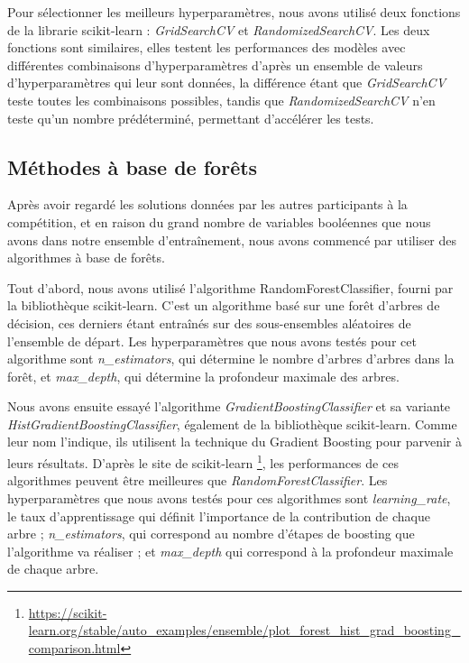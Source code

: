 \documentclass[a4paper]{article}
\begin{document}
    Pour sélectionner les meilleurs hyperparamètres, nous avons utilisé deux fonctions de la librarie scikit-learn : {\it GridSearchCV} et {\it RandomizedSearchCV}.
    Les deux fonctions sont similaires, elles testent les performances des modèles avec différentes combinaisons d'hyperparamètres d'après un ensemble de valeurs d'hyperparamètres
    qui leur sont données, la différence étant que {\it GridSearchCV} teste toutes les combinaisons possibles, tandis que
    {\it RandomizedSearchCV} n'en teste qu'un nombre prédéterminé, permettant d'accélérer les tests.

    \subsection{Méthodes à base de forêts}

    Après avoir regardé les solutions données par les autres participants à la compétition, et en raison du grand nombre de variables booléennes que nous avons dans notre
    ensemble d'entraînement, nous avons commencé par utiliser des algorithmes à base de forêts.

    Tout d'abord, nous avons utilisé l'algorithme RandomForestClassifier, fourni par la bibliothèque scikit-learn.
    C'est un algorithme basé sur une forêt d'arbres de décision, ces derniers étant entraînés sur des sous-ensembles aléatoires de l'ensemble de départ.
    Les hyperparamètres que nous avons testés pour cet algorithme sont {\it n\_estimators}, qui détermine le nombre d'arbres d'arbres dans la forêt,
    et {\it max\_depth}, qui détermine la profondeur maximale des arbres.

    Nous avons ensuite essayé l'algorithme {\it GradientBoostingClassifier} et sa variante {\it HistGradientBoostingClassifier}, également de la bibliothèque scikit-learn.
    Comme leur nom l'indique, ils utilisent la technique du Gradient Boosting pour parvenir à leurs résultats. 
    D'après le site de scikit-learn \footnote{\url{https://scikit-learn.org/stable/auto_examples/ensemble/plot_forest_hist_grad_boosting_comparison.html}}, les performances de
    ces algorithmes peuvent être meilleures que {\it RandomForestClassifier}.
    Les hyperparamètres que nous avons testés pour ces algorithmes sont {\it learning\_rate}, le taux d'apprentissage qui définit l'importance de la contribution de chaque arbre ;
    {\it n\_estimators}, qui correspond au nombre d'étapes de boosting que l'algorithme va réaliser ; et {\it max\_depth} qui correspond à la profondeur maximale de chaque arbre.
\end{document}
